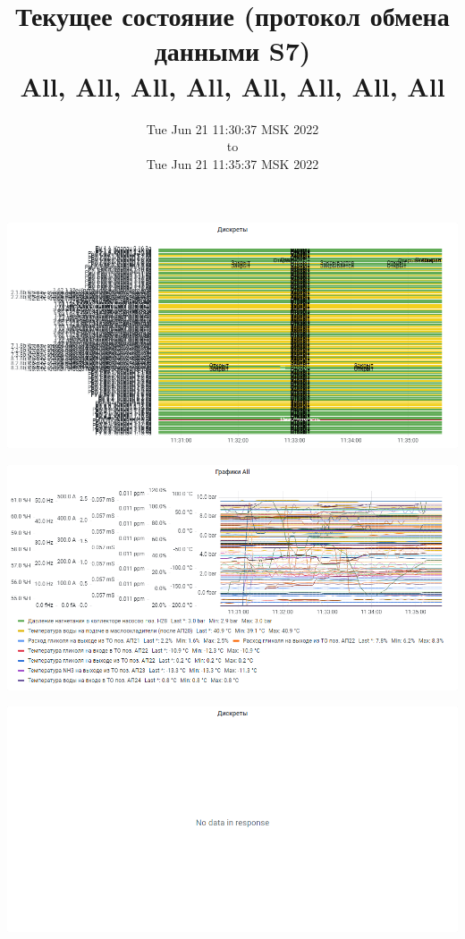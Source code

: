 \documentclass{article}
\begin{document}
\title{Текущее состояние (протокол обмена данными S7)  \\ \large All, All, All, All, All, All, All, All  }
\date{Tue Jun 21 11:30:37 MSK 2022\\to\\Tue Jun 21 11:35:37 MSK 2022}
\maketitle
\begin{center}
\par
\vspace{0.5cm}
\includegraphics[width=\textwidth]{image15}
\par
\vspace{0.5cm}
\par
\vspace{0.5cm}
\includegraphics[width=\textwidth]{image12}
\par
\vspace{0.5cm}
\par
\vspace{0.5cm}
\includegraphics[width=\textwidth]{image154}

\end{center}
\end{document}
